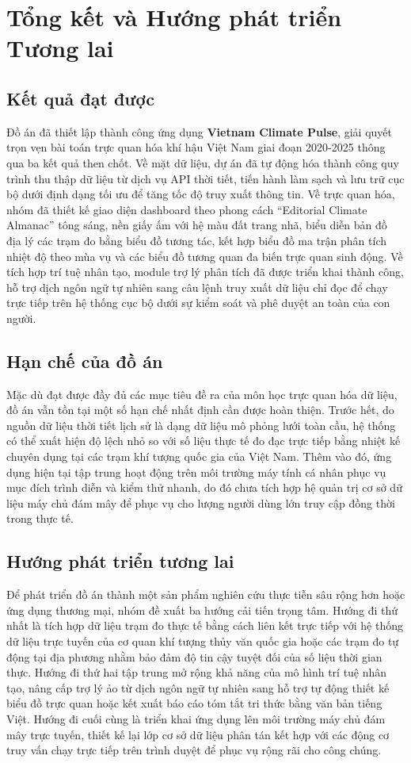 \chapter{Tổng kết và Hướng phát triển Tương lai}

\section{Kết quả đạt được}
Đồ án đã thiết lập thành công ứng dụng \textbf{Vietnam Climate Pulse}, giải quyết trọn vẹn bài toán trực quan hóa khí hậu Việt Nam giai đoạn 2020-2025 thông qua ba kết quả then chốt. Về mặt dữ liệu, dự án đã tự động hóa thành công quy trình thu thập dữ liệu từ dịch vụ API thời tiết, tiến hành làm sạch và lưu trữ cục bộ dưới định dạng tối ưu để tăng tốc độ truy xuất thông tin. Về trực quan hóa, nhóm đã thiết kế giao diện dashboard theo phong cách ``Editorial Climate Almanac'' tông sáng, nền giấy ấm với hệ màu đất trang nhã, biểu diễn bản đồ địa lý các trạm đo bằng biểu đồ tương tác, kết hợp biểu đồ ma trận phân tích nhiệt độ theo mùa vụ và các biểu đồ tương quan đa biến trực quan sinh động. Về tích hợp trí tuệ nhân tạo, module trợ lý phân tích đã được triển khai thành công, hỗ trợ dịch ngôn ngữ tự nhiên sang câu lệnh truy xuất dữ liệu chỉ đọc để chạy trực tiếp trên hệ thống cục bộ dưới sự kiểm soát và phê duyệt an toàn của con người.

\section{Hạn chế của đồ án}
Mặc dù đạt được đầy đủ các mục tiêu đề ra của môn học trực quan hóa dữ liệu, đồ án vẫn tồn tại một số hạn chế nhất định cần được hoàn thiện. Trước hết, do nguồn dữ liệu thời tiết lịch sử là dạng dữ liệu mô phỏng lưới toàn cầu, hệ thống có thể xuất hiện độ lệch nhỏ so với số liệu thực tế đo đạc trực tiếp bằng nhiệt kế chuyên dụng tại các trạm khí tượng quốc gia của Việt Nam. Thêm vào đó, ứng dụng hiện tại tập trung hoạt động trên môi trường máy tính cá nhân phục vụ mục đích trình diễn và kiểm thử nhanh, do đó chưa tích hợp hệ quản trị cơ sở dữ liệu máy chủ đám mây để phục vụ cho lượng người dùng lớn truy cập đồng thời trong thực tế.

\section{Hướng phát triển tương lai}
Để phát triển đồ án thành một sản phẩm nghiên cứu thực tiễn sâu rộng hơn hoặc ứng dụng thương mại, nhóm đề xuất ba hướng cải tiến trọng tâm. Hướng đi thứ nhất là tích hợp dữ liệu trạm đo thực tế bằng cách liên kết trực tiếp với hệ thống dữ liệu trực tuyến của cơ quan khí tượng thủy văn quốc gia hoặc các trạm đo tự động tại địa phương nhằm bảo đảm độ tin cậy tuyệt đối của số liệu thời gian thực. Hướng đi thứ hai tập trung mở rộng khả năng của mô hình trí tuệ nhân tạo, nâng cấp trợ lý ảo từ dịch ngôn ngữ tự nhiên sang hỗ trợ tự động thiết kế biểu đồ trực quan hoặc kết xuất báo cáo tóm tắt tri thức bằng văn bản tiếng Việt. Hướng đi cuối cùng là triển khai ứng dụng lên môi trường máy chủ đám mây trực tuyến, thiết kế lại lớp cơ sở dữ liệu phân tán kết hợp với các động cơ truy vấn chạy trực tiếp trên trình duyệt để phục vụ rộng rãi cho công chúng.
